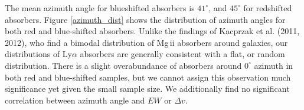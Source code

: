 \documentclass[iop]{emulateapj-rtx4}
\begin{document}
The mean azimuth angle for blueshifted absorbers is $41^{\circ}$, and $45^{\circ}$ for redshifted absorbers. Figure \ref{azimuth_dist} shows the distribution of azimuth angles for both red and blue-shifted absorbers. Unlike the findings of Kacprzak et al. (2011, 2012), who find a bimodal distribution of Mg\,{\sc ii} absorbers around galaxies, our distributions of Ly$\alpha$ absorbers are generally consistent with a flat, or random distribution. There is a slight overabundance of absorbers around $0^{\circ}$ azimuth in both red and blue-shifted samples, but we cannot assign this observation much significance yet given the small sample size. We additionally find no significant correlation between azimuth angle and $EW$ or $\Delta v$. 



%
% 
\end{document}
